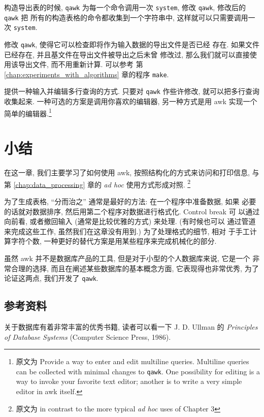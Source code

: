 \begin{exercise}
    \label{exer:system}
	构造导出表的时候, \texttt{qawk} 为每一个命令调用一次
	\texttt{system}, 修改 \texttt{qawk}, 修改后的 \texttt{qawk} 把
	所有的构造表格的命令都收集到一个字符串中, 这样就可以只需要调用一次
	\texttt{system}.
\end{exercise}

\begin{exercise}
    \label{exer:qawk}
	修改 \texttt{qawk}, 使得它可以检查即将作为输入数据的导出文件是否已经
	存在. 如果文件已经存在, 并且基文件在导出文件被导出之后未曾
	修改过, 那么我们就可以直接使用该导出文件, 而不用重新计算. 可以参考
	第 \ref{chap:experiments_with_algorithms} 章的程序 \texttt{make}.
\end{exercise}

\begin{exercise}
    \label{exer:multiline_query}
	提供一种输入并编辑多行查询的方式. 只要对 \texttt{qawk} 作些许修改,
	就可以把多行查询收集起来. 一种可选的方案是调用你喜欢的编辑器,
	另一种方式是用 awk 实现一个简单的编辑器.\footnote{原文为 Provide a
		way to enter and edit multiline queries. Multiline queries
		can be collected with minimal changes to \texttt{qawk}. One
		possibility for editing is a way to invoke your favorite
		text editor; another is to write a very simple editor in
	awk itself.}
\end{exercise}

\section{小结}
\label{sec:reports_and_databases_summary}
在这一章, 我们主要学习了如何使用 awk, 按照结构化的方式来访问和打印信息,
与第 \ref{chap:data_processing} 章的 \textit{ad hoc} 使用方式形成对照.
\footnote{原文为 in contrast to the more typical \textit{ad hoc} uses of
Chapter 3}

为了生成表格, ``分而治之'' 通常是最好的方法: 在一个程序中准备数据, 如果
必要的话就对数据排序, 然后用第二个程序对数据进行格式化. Control break 可
以通过向前看, 或者撤回输入 (通常是比较优雅的方式) 来处理. (有时候也可以
通过管道来完成这些工作, 虽然我们在这章没有用到.) 为了处理格式的细节, 相对
于手工计算字符个数, 一种更好的替代方案是用某些程序来完成机械化的部分.

虽然 awk 并不是数据库产品的工具, 但是对于小型的个人数据库来说, 它是一个
非常合理的选择, 而且在阐述某些数据库的基本概念方面, 它表现得也非常优秀,
为了论证这两点, 我们开发了 \texttt{qawk}.

\subsection*{参考资料}
关于数据库有着非常丰富的优秀书籍, 读者可以看一下 J. D. Ullman 的
\textit{Principles of Database Systems} (Computer Science Press, 1986).

